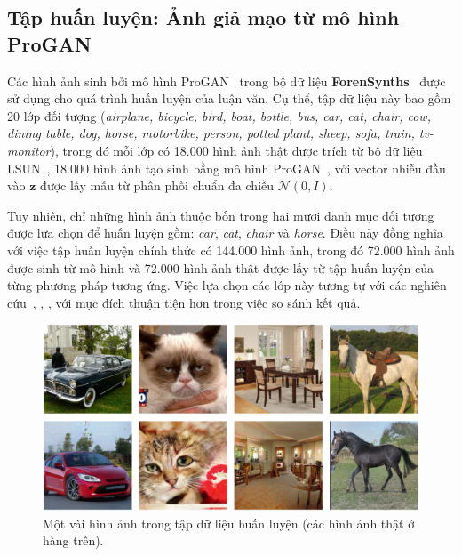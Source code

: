 \subsection{Tập huấn luyện: Ảnh giả mạo từ mô hình ProGAN}
\label{ssec:tap_du_lieu_progan}
%
Các hình ảnh sinh bởi mô hình ProGAN~\cite{karras2018progressive} trong bộ dữ liệu \textbf{ForenSynths}~\cite{Wang2019CNNGeneratedIA} được sử dụng cho quá trình huấn luyện của luận văn. 
%
Cụ thể, tập dữ liệu này bao gồm 20 lớp đối tượng (\textit{airplane, bicycle, bird, boat, bottle, bus, car, cat, chair, cow, dining table, dog, horse, motorbike, person, potted plant, sheep, sofa, train, tv-monitor}), trong đó mỗi lớp có 18.000 hình ảnh thật được trích từ bộ dữ liệu LSUN~\cite{Yu2015LSUNCO}, 18.000 hình ảnh tạo sinh bằng mô hình ProGAN~\cite{karras2018progressive}, với vector nhiễu đầu vào \( \mathbf{z} \) được lấy mẫu từ phân phối chuẩn đa chiều \( \mathcal{N}(0, I) \).
%
%

Tuy nhiên, chỉ những hình ảnh thuộc bốn trong hai mươi danh mục đối tượng được lựa chọn để huấn luyện gồm: \textit{car}, \textit{cat}, \textit{chair} và \textit{horse}.
%
Điều này đồng nghĩa với việc tập huấn luyện chính thức có 144.000 hình ảnh, trong đó 72.000 hình ảnh được sinh từ mô hình và 72.000 hình ảnh thật được lấy từ tập huấn luyện của từng phương pháp tương ứng.
%
Việc lựa chọn các lớp này tương tự với các nghiên cứu~\cite{Tan2023RethinkingTU}, \cite{Jeong2022FrePGANRD}, \cite{Jeong2021BiHPFBH}, với mục đích thuận tiện hơn trong việc so sánh kết quả.
%
%
\begin{figure}[ht!]
	\centering
	\includegraphics[width=1.0\linewidth]{Images/dataset_progan_samples.png}
	\begin{minipage}{1.0\linewidth}
		\vspace{5mm}
		\caption{Một vài hình ảnh trong tập dữ liệu huấn luyện (các hình ảnh thật ở hàng trên).}
		\label{fig:dataset_progan_samples}
	\end{minipage}
\end{figure}
%

